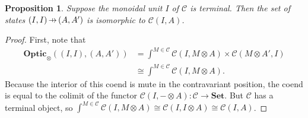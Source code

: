 \documentclass[11pt,letterpaper]{article}
\theoremstyle{plain}
\newtheorem{proposition}[theorem]{Proposition}
\theoremstyle{definition}
\newcommand{\C}{\mathscr{C}}
\newcommand{\Set}{\mathbf{Set}}
\newcommand{\Optic}{\mathbf{Optic}}
\newcommand{\hto}{\ensuremath{\,\mathaccent\shortmid\rightarrow\,}}
\begin{document}
\begin{proposition}
  Suppose the monoidal unit $I$ of $\C$ is terminal. Then the set of states $(I, I) \hto (A, A')$ is isomorphic to $\C(I, A)$.
\end{proposition}
\begin{proof}
  First, note that
  \begin{align*}
    \Optic_\otimes((I,I), (A,A'))
    &= \int^{M \in \C} \C(I, M \otimes A) \times \C(M \otimes A', I) \\
    &\cong \int^{M \in \C} \C(I, M \otimes A).
  \end{align*}
  Because the interior of this coend is mute in the contravariant position, the coend is equal to the colimit of the functor $\C(I, - \otimes A) : \C \to \Set$. But $\C$ has a terminal object, so $\int^{M \in \C} \C(I, M \otimes A) \cong \C(I, I \otimes A) \cong \C(I, A)$.
\end{proof}
\end{document}
